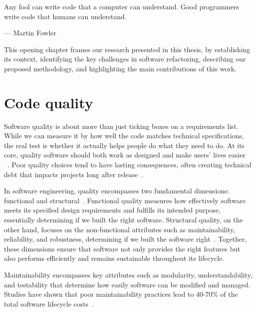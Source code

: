\epigraph{Any fool can write code that a computer can understand. Good programmers write code that humans can understand.}{--- \textup{Martin Fowler}}



This opening chapter frames our research presented in this thesis, by establishing its context, identifying the key challenges in software refactoring, describing our proposed methodology, and highlighting the main contributions of this work.

\section{Code quality}

Software quality is about more than just ticking boxes on a requirements list. While we can measure it by how well the code matches technical specifications, the real test is whether it actually helps people do what they need to do. At its core, quality software should both work as designed and make users' lives easier ~\cite{spinellis2006code}. Poor quality choices tend to have lasting consequences, often creating technical debt that impacts projects long after release~\cite{seaman2011measuring}. 

In software engineering, quality encompasses two fundamental dimensions: functional and structural~\cite{balci1998verification}. Functional quality measures how effectively software meets its specified design requirements and fulfills its intended purpose, essentially determining if we built the right software. Structural quality, on the other hand, focuses on the non-functional attributes such as maintainability, reliability, and robustness, determining if we built the software right~\cite{madler2021applying}. Together, these dimensions ensure that software not only provides the right features but also performs efficiently and remains sustainable throughout its lifecycle.

Maintainability encompasses key attributes such as modularity, understandability, and testability that determine how easily software can be modified and managed. Studies have shown that poor maintainability practices lead to $40$-$70$\% of the total software lifecycle costs~\cite{seacord2003modernizing}. 

